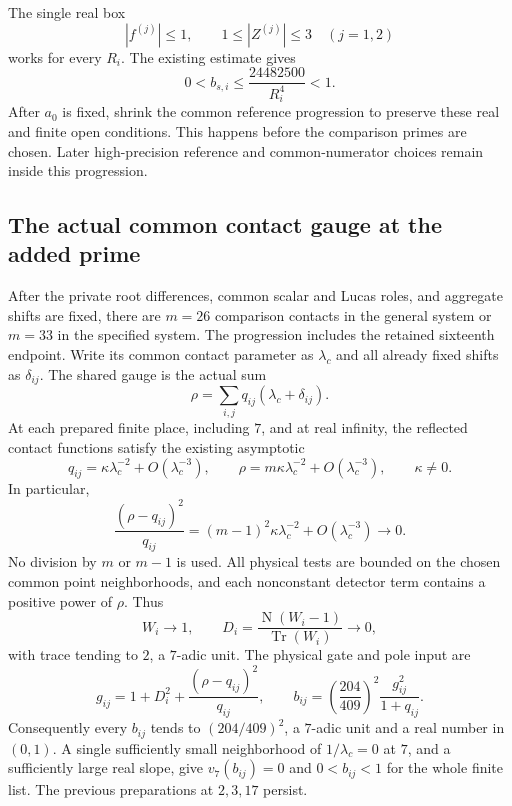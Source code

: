 \documentclass[11pt]{article}
\DeclareMathOperator{\Tr}{Tr}
\DeclareMathOperator{\Nm}{N}
\begin{document}
The single real box
\[
 |f^{(j)}|\le1,\qquad 1\le|Z^{(j)}|\le3\quad(j=1,2)
\]
works for every $R_i$. The existing estimate gives
\[
 0<b_{s,i}\le\frac{24482500}{R_i^4}<1.
\]
After $a_0$ is fixed, shrink the common reference progression to
preserve these real and finite open conditions. This happens before
the comparison primes are chosen. Later high-precision reference
and common-numerator choices remain inside this progression.

\subsection{The actual common contact gauge at the added prime}

After the private root differences, common scalar and Lucas roles,
and aggregate shifts are fixed, there are $m=26$ comparison
contacts in the general system or $m=33$ in the specified system.
The progression includes the retained sixteenth endpoint. Write
its common contact parameter as $\lambda_c$ and all already fixed
shifts as $\delta_{ij}$. The shared gauge is the actual sum
\[
 \rho=\sum_{i,j}q_{ij}(\lambda_c+\delta_{ij}).
\]
At each prepared finite place, including $7$, and at real infinity,
the reflected contact functions satisfy the existing asymptotic
\[
 q_{ij}=\kappa\lambda_c^{-2}+O(\lambda_c^{-3}),\qquad
 \rho=m\kappa\lambda_c^{-2}+O(\lambda_c^{-3}),\qquad\kappa\ne0.
\]
In particular,
\begin{equation}\label{gaugeasymptotic}
 \frac{(\rho-q_{ij})^2}{q_{ij}}
       =(m-1)^2\kappa\lambda_c^{-2}+O(\lambda_c^{-3})\longrightarrow0.
\end{equation}
No division by $m$ or $m-1$ is used. All physical tests are bounded
on the chosen common point neighborhoods, and each nonconstant
detector term contains a positive power of $\rho$. Thus
\[
 W_i\longrightarrow1,\qquad
 D_i=\frac{\Nm(W_i-1)}{\Tr(W_i)}\longrightarrow0,
\]
with trace tending to $2$, a $7$-adic unit. The physical gate and
pole input are
\begin{equation}\label{comparisoninput}
 g_{ij}=1+D_i^2+\frac{(\rho-q_{ij})^2}{q_{ij}},\qquad
 b_{ij}=\left(\frac{204}{409}\right)^2\frac{g_{ij}^2}{1+q_{ij}}.
\end{equation}
Consequently every $b_{ij}$ tends to $(204/409)^2$, a $7$-adic
unit and a real number in $(0,1)$. A single sufficiently small
neighborhood of $1/\lambda_c=0$ at $7$, and a sufficiently large
real slope, give $v_7(b_{ij})=0$ and $0<b_{ij}<1$ for the whole
finite list. The previous preparations at $2,3,17$ persist.
\end{document}
